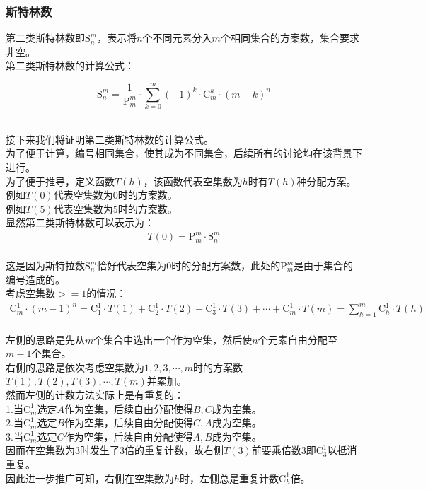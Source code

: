 \documentclass[UTF8]{ctexart}
\newcommand{\Pe}{\mathrm{P}}
\newcommand{\Co}{\mathrm{C}}
\newcommand{\St}{\mathrm{S}}
\begin{document}
\subsubsection{斯特林数}
    \setcounter{equation}{0}
    第二类斯特林数即$\St_n^m$，表示将$n$个不同元素分入$m$个相同集合的方案数，集合要求非空。\\[3mm]
    第二类斯特林数的计算公式：
    \begin{large}
        \begin{equation*}
            \St_n^m=\frac{1}{\Pe_m^m}\cdot\sum_{k=0}^{m}(-1)^k\cdot\Co_m^k\cdot(m-k)^n
        \end{equation*}
    \end{large}\\
    接下来我们将证明第二类斯特林数的计算公式。\\[3mm]
    为了便于计算，编号相同集合，使其成为不同集合，后续所有的讨论均在该背景下进行。\\[3mm]
    为了便于推导，定义函数$T(h)$，该函数代表空集数为$h$时有$T(h)$种分配方案。\\[3mm]
    例如$T(0)$代表空集数为$0$时的方案数。\\[3mm]
    例如$T(5)$代表空集数为$5$时的方案数。\\[3mm]
    显然第二类斯特林数可以表示为：
    \begin{align}
        T(0)=\Pe_m^m\cdot\St_n^m
    \end{align}\\
    这是因为斯特拉数$\St_n^m$恰好代表空集为$0$时的分配方案数，此处的$\Pe_m^m$是由于集合的编号造成的。\\[9mm]
    考虑空集数$>=1$的情况：
    \begin{align}
        \Co_m^1\cdot(m-1)^n=\Co_1^1\cdot T(1)+\Co_2^1\cdot T(2)+\Co_3^1\cdot T(3)+\cdots+\Co_m^1\cdot T(m)=\sum_{h=1}^m\Co_h^1\cdot T(h)
    \end{align}\\
    左侧的思路是先从$m$个集合中选出一个作为空集，然后使$n$个元素自由分配至$m-1$个集合。\\[3mm]
    右侧的思路是依次考虑空集数为$1,2,3,\cdots,m$时的方案数$T(1),T(2),T(3),\cdots,T(m)$并累加。\\[3mm]
    然而左侧的计数方法实际上是有重复的：\\[3mm]
    1.当$\Co_m^1$选定$A$作为空集，后续自由分配使得$B,C$\hspace{4.0pt}成为空集。\\[3mm]
    2.当$\Co_m^1$选定$B$\hspace{4.0pt}作为空集，后续自由分配使得$C,A$成为空集。\\[3mm]
    3.当$\Co_m^1$选定$C$\hspace{3.5pt}作为空集，后续自由分配使得$A,B$\hspace{3.0pt}成为空集。\\[3mm]
    因而在空集数为$3$时发生了$3$倍的重复计数，故右侧$T(3)$前要乘倍数$3$即$\Co_3^1$以抵消重复。\\[3mm]
    因此进一步推广可知，右侧在空集数为$h$时，左侧总是重复计数$\Co_h^1$倍。
\end{document}

